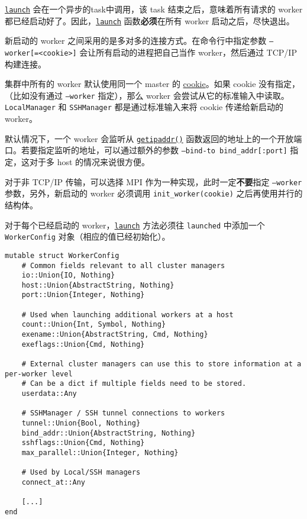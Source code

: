 \hyperlink{7346188534454273843}{\texttt{launch}} 会在一个异步的task中调用，该 task 结束之后，意味着所有请求的 worker 都已经启动好了。因此，\hyperlink{7346188534454273843}{\texttt{launch}} 函数\textbf{必须}在所有 worker 启动之后，尽快退出。



新启动的 worker 之间采用的是多对多的连接方式。在命令行中指定参数 \texttt{--worker[=<cookie>]} 会让所有启动的进程把自己当作 worker，然后通过 TCP/IP 构建连接。



集群中所有的 worker 默认使用同一个 master 的 \hyperlink{12947285545876463888}{cookie}。如果 cookie 没有指定，（比如没有通过 \texttt{--worker} 指定），那么 worker 会尝试从它的标准输入中读取。\texttt{LocalManager} 和 \texttt{SSHManager} 都是通过标准输入来将 cookie 传递给新启动的 worker。



默认情况下，一个 worker 会监听从 \hyperlink{11265435361532665287}{\texttt{getipaddr()}} 函数返回的地址上的一个开放端口。若要指定监听的地址，可以通过额外的参数 \texttt{--bind-to bind\_addr[:port]} 指定，这对于多 host 的情况来说很方便。



对于非 TCP/IP 传输，可以选择 MPI 作为一种实现，此时一定\textbf{不要}指定 \texttt{--worker} 参数，另外，新启动的 worker 必须调用 \texttt{init\_worker(cookie)} 之后再使用并行的结构体。



对于每个已经启动的 worker，\hyperlink{7346188534454273843}{\texttt{launch}} 方法必须往 \texttt{launched} 中添加一个 \texttt{WorkerConfig} 对象（相应的值已经初始化）。




\begin{verbatim}
mutable struct WorkerConfig
    # Common fields relevant to all cluster managers
    io::Union{IO, Nothing}
    host::Union{AbstractString, Nothing}
    port::Union{Integer, Nothing}

    # Used when launching additional workers at a host
    count::Union{Int, Symbol, Nothing}
    exename::Union{AbstractString, Cmd, Nothing}
    exeflags::Union{Cmd, Nothing}

    # External cluster managers can use this to store information at a per-worker level
    # Can be a dict if multiple fields need to be stored.
    userdata::Any

    # SSHManager / SSH tunnel connections to workers
    tunnel::Union{Bool, Nothing}
    bind_addr::Union{AbstractString, Nothing}
    sshflags::Union{Cmd, Nothing}
    max_parallel::Union{Integer, Nothing}

    # Used by Local/SSH managers
    connect_at::Any

    [...]
end
\end{verbatim}



